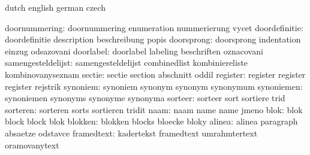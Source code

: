 


\startsetupvariables  dutch                english             german
                      czech

      doornummering:  doornummering        enumeration         nummerierung
                      vycet
      doordefinitie:  doordefinitie        description         beschreibung
                      popis
         doorsprong:  doorsprong           indentation         einzug
                      odsazovani
          doorlabel:  doorlabel            labeling            beschriften
                      oznacovani
 samengesteldelijst:  samengesteldelijst   combinedlist        kombiniereliste
                      kombinovanyseznam
             sectie:  sectie               section             abschnitt
                      oddil
           register:  register             register            register
                      rejstrik
           synoniem:  synoniem             synonym             synonym
                      synonymum
         synoniemen:  synoniemen           synonyms            synonyme
                      synonyma
            sorteer:  sorteer              sort                sortiere
                      trid
           sorteren:  sorteren             sorts               sortieren
                      tridit
               naam:  naam                 name                name
                      jmeno
               blok:  blok                 block               block
                      blok
            blokken:  blokken              blocks              bloecke
                      bloky
             alinea:  alinea               paragraph           absaetze
                      odstavce %
         framedtext:  kadertekst           framedtext          umrahmtertext
                      oramovanytext

\stopsetupvariables




